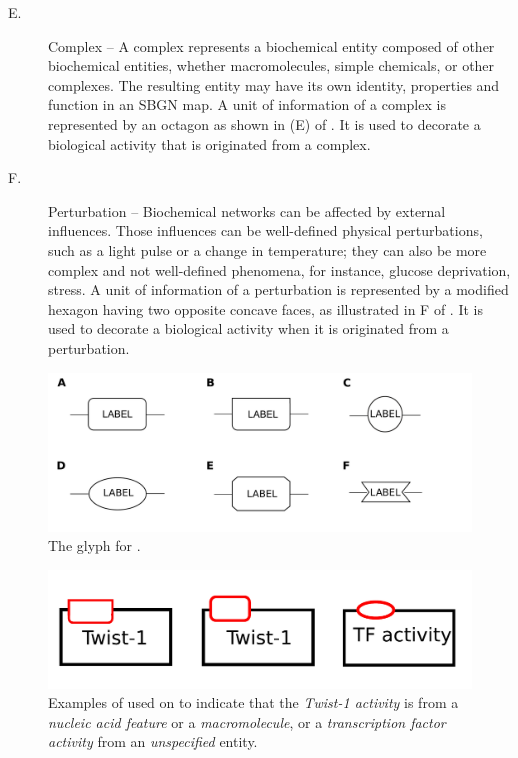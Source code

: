 \begin{glyphDescription}
\begin{description}
\item[E.] Complex -- A complex represents a biochemical entity composed of other biochemical entities, whether macromolecules, simple chemicals, or other complexes. The resulting entity may 
have its own identity, properties and function in an SBGN map. A unit of information of a complex is represented by an octagon as shown in (E) of .  It is used to decorate a biological activity that is originated from a complex.

\item[F.] Perturbation -- Biochemical networks can be affected by external influences. Those influences can be well-defined physical perturbations, such as a light pulse or a change in temperature; they can also be more complex and not well-defined phenomena, for instance, glucose deprivation, stress.  A unit of information of a perturbation is represented by a modified hexagon
having two opposite concave faces, as illustrated in F of  .  It is used to decorate a biological activity when it is originated from a perturbation.
\end{description}

\begin{figure}[H]
  \centering
  \includegraphics[scale = 0.2]{images/build/unitInformation_ba.pdf}
  \caption{The \AF glyph for .}
  \label{fig:af:unitInfo}
\end{figure}

\begin{figure}[H]
  \centering
  \includegraphics[scale = 0.5]{examples/unitofinformation}
  \caption{Examples of  used on  to indicate that the \emph{Twist-1 activity} is from a \emph{nucleic acid feature} or a \emph{macromolecule}, or a \emph{transcription factor activity} from an \emph{unspecified} entity.}
  \label{fig:af:unitofinfo}
\end{figure}


\end{glyphDescription}
